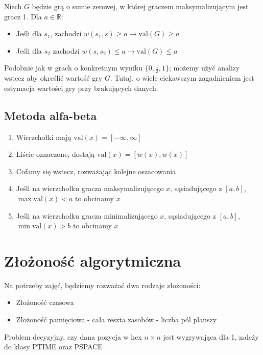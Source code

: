 \documentclass{../notatki}
\begin{document}
Niech $G$ będzie grą o sumie zerowej, w której graczem
maksymalizującym jest gracz 1. Dla $a \in \mathbb{R}$:
\begin{itemize}
  \item Jeśli dla $s_1$, zachodzi $w(s_1, s) \geq a \rightarrow
    \textrm{val}(G) \geq a$
  \item Jeśli dla $s_2$ zachodzi $w(s, s_2) \leq a \rightarrow
    \textrm{val}(G) \leq a$
\end{itemize}

Podobnie jak w grach o konkretnym wyniku $\{0, \frac{1}{2}, 1\}$; możemy użyć
analizy wstecz aby określić wartość gry $G$. Tutaj, o wiele ciekawszym
zagadnieniem jest estymacja wartości gry przy brakujących danych.

\subsection{Metoda alfa-beta}

\begin{enumerate}
  \item Wierzchołki mają $\textrm{val}(x) = [-\infty, \infty]$
  \item Liście oznaczone, dostają $\textrm{val}(x) = [w(x), w(x)]$
  \item Cofamy się wstecz, rozważając kolejne oszacowania
  \item Jeśli na wierzchołku gracza maksymalizującego $x$, sąsiadującego z
    $[a, b]$, $\max \textrm{val}(x) < a$ to obcinamy $x$
  \item Jeśli na wierzchołku gracza minimalizującego $x$, sąsiadującego z
    $[a, b]$, $\min \textrm{val}(x) > b$ to obcinamy $x$
\end{enumerate}

\section{Złożoność algorytmiczna}

Na potrzeby zajęć, będziemy rozważać dwa rodzaje złożoności:
\begin{itemize}
  \item Złożoność czasowa
  \item Złożoność pamięciowa - cała reszta zasobów - liczba pól planszy
\end{itemize}

\begin{examplebox}
  Problem decyzyjny, czy dana pozycja w hex $n \times n$ jest wygrywająca dla 1,
  należy do klasy PTIME oraz PSPACE
\end{examplebox}
\end{document}
